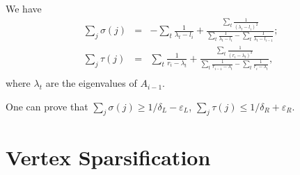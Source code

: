 \documentclass[12pt]{article}
\newcommand{\eps}{\varepsilon}
\begin{document}
    We have
    \begin{eqnarray*}
        \sum_j \sigma(j) &=& -\sum_t \frac{1}{\lambda_t - l_i} +
        \frac{\sum_t \frac{1}{(\lambda_t - l_i)^2}}
        {\sum_t \frac{1}{\lambda_t - l_i} - \sum_t \frac{1}{\lambda_t - l_{i-1}}};\\ 
        \sum_j \tau(j) &=& \sum_t \frac{1}{r_i - \lambda_t} +
        \frac{\sum_t \frac{1}{(r_i - \lambda_t)^2}}
        {\sum_t \frac{1}{r_{i-1} - \lambda_t} - \sum_t \frac{1}{r_i - \lambda_t}},\\ 
    \end{eqnarray*}
    where $\lambda_t$ are the eigenvalues of $A_{i-1}$.

    One can prove that $\sum_j \sigma(j) \geq 1 / \delta_L - \eps_L$,
    $\sum_j \tau(j) \leq 1 / \delta_R + \eps_R$.

    \section{Vertex Sparsification}
    
    
\end{document}
